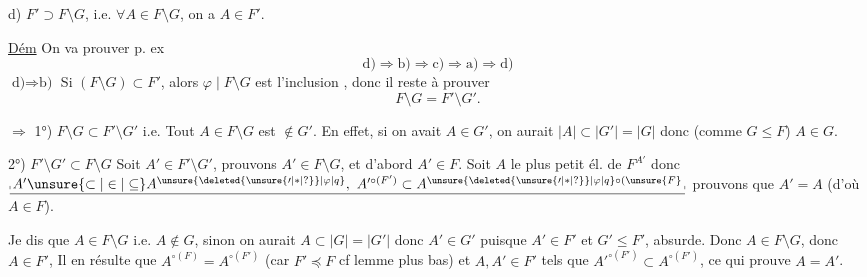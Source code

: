d) $F'\supset F\setminus G$, i.e. $\forall A\in F\setminus G$, on a $A\in F'$.

\uline{Dém} On va prouver p. ex
\[
 \text{d)}\Longrightarrow\text{b)}\Longrightarrow\text{c)}\Longrightarrow\text{a)}\Longrightarrow\text{d)}
\]
 $\text{d)}\Rightarrow\text{b)}$ Si $(F\setminus G)\subset F'$, alors $\varphi\mid F\setminus G$ est l'inclusion  ,  donc il reste à prouver
\[
 F\setminus G=F'\setminus G'.
\]

 $\Rightarrow$ 1°) $F\setminus G\subset F'\setminus G'$ i.e. Tout $A\in F\setminus G$ est $\notin G'$. En effet, si on avait $A\in G'$, on aurait $|A|\subset|G'|=|G|$ donc  (comme $G\leq F$) $A\in G$.


2°) $F'\setminus G'\subset F\setminus G$ Soit $A'\in F'\setminus G'$, prouvons $A'\in F\setminus G$, et d'abord $A'\in F$.  Soit $A$ le plus petit él. de $F^{A'}$ donc $\underline{\rule[-.15ex]{.35pt}{.55ex}\,A'\unsure{\subset|\in|\subseteq} A^{\unsure{\deleted{\unsure{\prime|\ast|?}}|\varphi|q}},\ A'^{\circ(F')}\subset A^{\unsure{\deleted{\unsure{\prime|\ast|?}}|\varphi|q}\circ(\unsure{F}}\,\rule[-.15ex]{.35pt}{.55ex}}$ prouvons que $A'=A$ (d'où $A\in F$). 

Je dis que $A\in F\setminus G$ i.e. $A\notin G$, sinon on aurait $A\subset|G|=|G'|$ donc $A'\in G'$ puisque $A'\in F'$ et $G'\leq F'$, absurde.  Donc $A\in F\setminus G$, donc $A\in F'$,  Il en résulte que $A^{\circ(F)}=A^{\circ(F')}$ (car $F'\preceq F$\deleted{)} cf lemme plus bas) et   $A,A'\in F'$ tels que $A'^{\circ(F')}\subset A^{\circ(F')}$, ce qui prouve $A=A'$.


